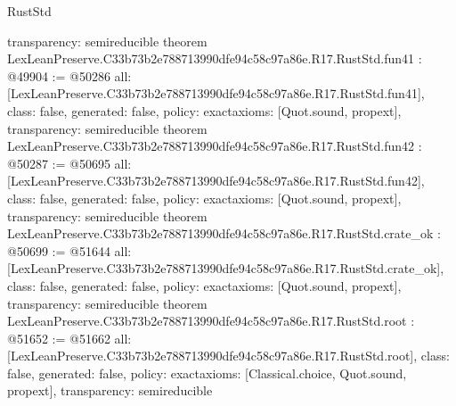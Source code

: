 \begin{lexlean}{RustStd}
\begin{coremodule}
{  transparency: semireducible
}
theorem LexLeanPreserve.C33b73b2e788713990dfe94c58c97a86e.R17.RustStd.fun41 : @49904 := @50286 {
  all: [LexLeanPreserve.C33b73b2e788713990dfe94c58c97a86e.R17.RustStd.fun41],
  class: false,
  generated: false,
  policy: exact{axioms: [Quot.sound, propext]},
  transparency: semireducible
}
theorem LexLeanPreserve.C33b73b2e788713990dfe94c58c97a86e.R17.RustStd.fun42 : @50287 := @50695 {
  all: [LexLeanPreserve.C33b73b2e788713990dfe94c58c97a86e.R17.RustStd.fun42],
  class: false,
  generated: false,
  policy: exact{axioms: [Quot.sound, propext]},
  transparency: semireducible
}
theorem LexLeanPreserve.C33b73b2e788713990dfe94c58c97a86e.R17.RustStd.crate_ok : @50699 := @51644 {
  all: [LexLeanPreserve.C33b73b2e788713990dfe94c58c97a86e.R17.RustStd.crate_ok],
  class: false,
  generated: false,
  policy: exact{axioms: [Quot.sound, propext]},
  transparency: semireducible
}
theorem LexLeanPreserve.C33b73b2e788713990dfe94c58c97a86e.R17.RustStd.root : @51652 := @51662 {
  all: [LexLeanPreserve.C33b73b2e788713990dfe94c58c97a86e.R17.RustStd.root],
  class: false,
  generated: false,
  policy: exact{axioms: [Classical.choice, Quot.sound, propext]},
  transparency: semireducible
}


\end{coremodule}
\end{lexlean}
